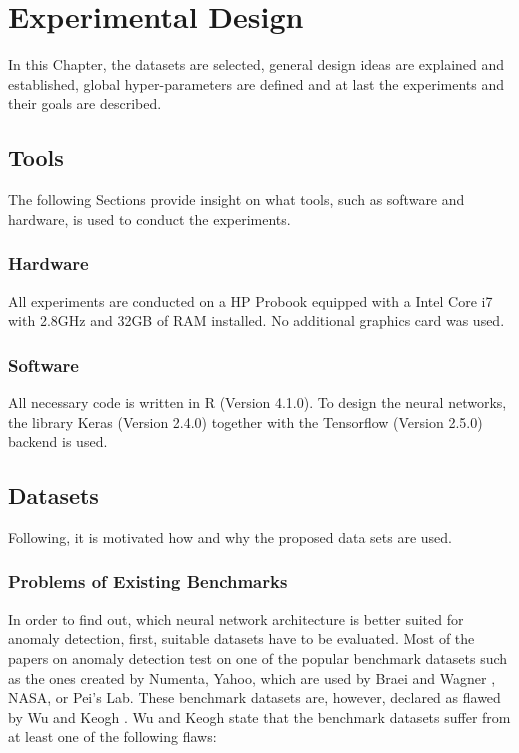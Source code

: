 \chapter{Experimental Design}
In this Chapter, the datasets are selected, general design ideas are explained and established, global hyper-parameters are defined and at last the experiments and their goals are described.

\section{Tools}
The following Sections provide insight on what tools, such as software and hardware, is used to conduct the experiments.

\subsection{Hardware}
All experiments are conducted on a HP Probook equipped with a Intel Core i7 with 2.8GHz and 32GB of RAM installed. No additional graphics card was used.

\subsection{Software}
All necessary code is written in R (Version 4.1.0). To design the neural networks, the library Keras (Version 2.4.0) together with the Tensorflow (Version 2.5.0) backend is used.


\section{Datasets}
Following, it is motivated how and why the proposed data sets are used.

\subsection{Problems of Existing Benchmarks} \label{Problems of Existing Benchmarks}
In order to find out, which neural network architecture is better suited for anomaly detection, first, suitable datasets have to be evaluated. Most of the papers on anomaly detection test on one of the popular benchmark datasets such as the ones created by Numenta, Yahoo,  which are used by Braei and Wagner \parencite{Braei2020}, NASA, or Pei's Lab. These benchmark datasets are, however, declared as flawed by Wu and Keogh \parencite*{Wu2020}. Wu and Keogh \parencite*{Wu2020} state that the benchmark datasets suffer from at least one of the following flaws:

